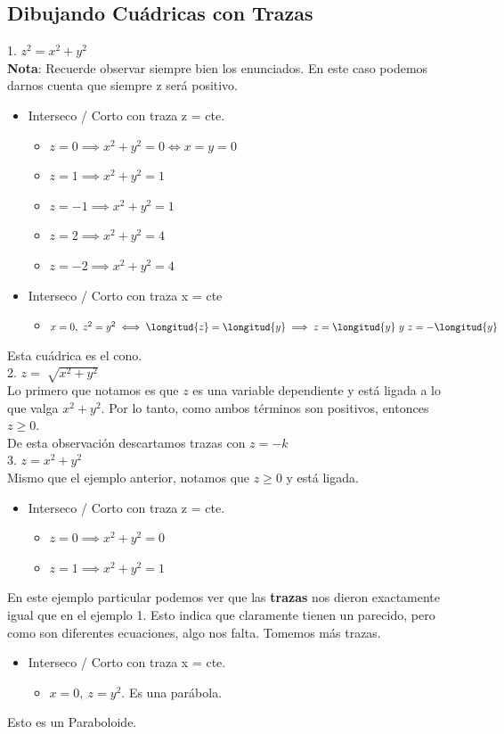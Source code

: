 \documentclass[10pt,a4paper]{article}
\begin{document}
\subsection*{Dibujando Cuádricas con Trazas}
\label{subsec:dibujando_cuadricas_con_trazas}
1. $z^{2} = x^{2} + y^{2}$ \\
\textbf{Nota}: Recuerde observar siempre bien los enunciados. En este caso podemos darnos cuenta que siempre z será positivo.
\begin{itemize}
    \item Interseco / Corto con traza z = cte.
    \begin{itemize}
        \item $ z = 0 \implies x^{2} + y^{2} = 0 \iff x = y = 0$
        \item $ z = 1 \implies x^{2} + y^{2} = 1$
        \item $ z = -1 \implies x^{2} + y^{2} = 1$
        \item $ z = 2 \implies x^{2} + y^{2} = 4$
        \item $ z = -2 \implies x^{2} + y^{2} = 4$
    \end{itemize}
    \item Interseco / Corto con traza x = cte
    \begin{itemize}
        \item $x = 0, \ z^{2} = y^{2} \iff \longitud{z} = \longitud{y} \implies z = \longitud{y} \ y \ z = -\longitud{y}$
    \end{itemize}
\end{itemize}
Esta cuádrica es el cono. \\
2. $z = \sqrt[]{x^{2} + y^{2}}$ \\
Lo primero que notamos es que $z$ es una variable dependiente y está ligada a lo que valga $x^{2} + y^{2}$. Por lo tanto, como ambos términos son positivos, entonces $z \ge 0 $. \\
De esta observación descartamos trazas con $ z = -k $ \\
3. $z = x^{2} + y^{2}$ \\
Mismo que el ejemplo anterior, notamos que $z \ge 0$ y está ligada. 
\begin{itemize}
    \item Interseco / Corto con traza z = cte.
    \begin{itemize}
        \item $z=0 \implies x^{2} + y^{2} = 0$
        \item $z=1 \implies x^{2} + y^{2} = 1$
    \end{itemize}
\end{itemize}
En este ejemplo particular podemos ver que las \textbf{trazas} nos dieron exactamente igual que en el ejemplo 1. Esto indica que claramente tienen un parecido, pero como son diferentes ecuaciones, algo nos falta. Tomemos más trazas. 
\begin{itemize}
    \item Interseco / Corto con traza x = cte.
    \begin{itemize}
        \item $x=0, \ z=y^{2}$. Es una parábola.
    \end{itemize}
\end{itemize}
Esto es un Paraboloide.
\end{document}

